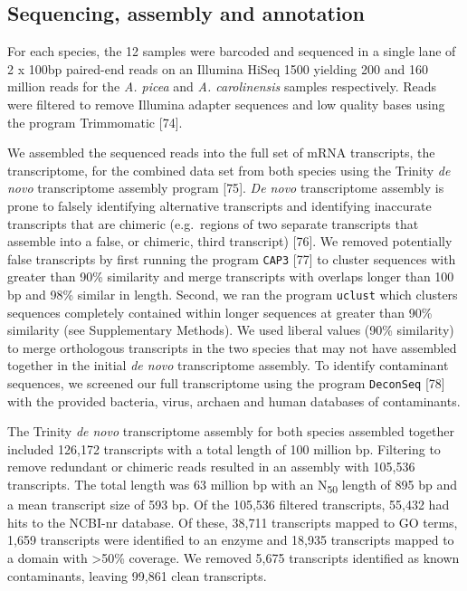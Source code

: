 \documentclass[]{article}
\begin{document}
\subsection{Sequencing, assembly and
annotation}\label{sequencing-assembly-and-annotation}

For each species, the 12 samples were barcoded and sequenced in a single
lane of 2 x 100bp paired-end reads on an Illumina HiSeq 1500 yielding
200 and 160 million reads for the \emph{A. picea} and \emph{A.
carolinensis} samples respectively. Reads were filtered to remove
Illumina adapter sequences and low quality bases using the program
Trimmomatic {[}74{]}.

We assembled the sequenced reads into the full set of mRNA transcripts,
the transcriptome, for the combined data set from both species using the
Trinity \emph{de novo} transcriptome assembly program {[}75{]}. \emph{De
novo} transcriptome assembly is prone to falsely identifying alternative
transcripts and identifying inaccurate transcripts that are chimeric
(e.g.~regions of two separate transcripts that assemble into a false, or
chimeric, third transcript) {[}76{]}. We removed potentially false
transcripts by first running the program \texttt{CAP3} {[}77{]} to
cluster sequences with greater than 90\% similarity and merge
transcripts with overlaps longer than 100 bp and 98\% similar in length.
Second, we ran the program \texttt{uclust} which clusters sequences
completely contained within longer sequences at greater than 90\%
similarity (see Supplementary Methods). We used liberal values (90\%
similarity) to merge orthologous transcripts in the two species that may
not have assembled together in the initial \emph{de novo} transcriptome
assembly. To identify contaminant sequences, we screened our full
transcriptome using the program \texttt{DeconSeq} {[}78{]} with the
provided bacteria, virus, archaen and human databases of contaminants.

The Trinity \emph{de novo} transcriptome assembly for both species
assembled together included 126,172 transcripts with a total length of
100 million bp. Filtering to remove redundant or chimeric reads resulted
in an assembly with 105,536 transcripts. The total length was 63 million
bp with an N\textsubscript{50} length of 895 bp and a mean transcript
size of 593 bp. Of the 105,536 filtered transcripts, 55,432 had hits to
the NCBI-nr database. Of these, 38,711 transcripts mapped to GO terms,
1,659 transcripts were identified to an enzyme and 18,935 transcripts
mapped to a domain with \textgreater{}50\% coverage. We removed 5,675
transcripts identified as known contaminants, leaving 99,861 clean
transcripts.
\end{document}
